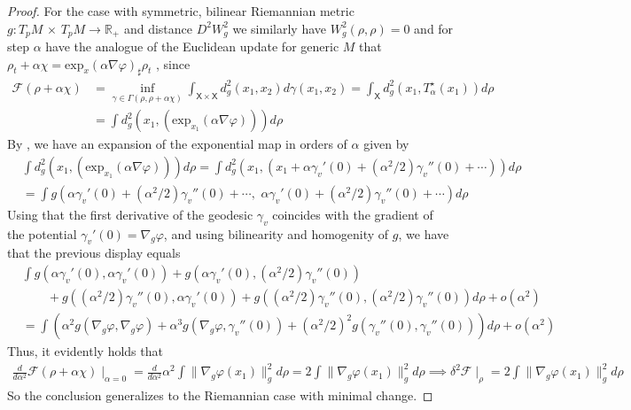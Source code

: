 \documentclass[reqno,11pt,letterpaper]{amsart}
\theoremstyle{plain}
\theoremstyle{definition}
\theoremstyle{remark}
\newcommand{\rgrad}{\nabla_{\!g}}
\begin{document}
\begin{proof}
For the case with symmetric, bilinear Riemannian metric $g: T_{p}M \, \times \, T_{p}M \to \mathbb{R}_{+}$ and distance $D^{2} W_{g}^{2}$ we similarly have $W_{g}^{2}(\rho, \rho ) = 0$ and for step $\alpha$ have the analogue of the Euclidean update for generic $M$ that $\rho_{t}+\alpha\chi =\mathrm{exp}_{x}(\alpha \nabla \varphi)_{\sharp} \rho_{t}$ \cite{McCann2001}, since
\begin{align*}
    \mathcal{F} (\rho + \alpha \chi) &= \inf_{\gamma \in \Gamma(\rho, \rho + \alpha \chi)} \int_{\mathsf{X} \times \mathsf{X}} d_{g}^{2}( x_{1} , x_{2} ) d\gamma(x_{1}, x_{2}) = \int_\mathsf{X} d_{g}^{2}(x_{1} , T^{\star}_{\alpha}(x_{1}) ) d \rho \\
    & = \int d_{g}^{2}( x_{1} ,\left( \mathrm{exp}_{x_{1}}(\alpha \nabla \varphi) \right) ) d \rho 
\end{align*}
By \cite{Monera2013}, we have an expansion of the exponential map in orders of $\alpha$ given by
\begin{align*}
  &\int d_{g}^{2}( x_{1} , \left( \mathrm{exp}_{x_{1}}(\alpha \nabla \varphi) \right) ) d \rho = \int d_{g}^{2}( x_{1} , \left( 
  x_{1}
  + \alpha \gamma_{v}'(0) + (\alpha^{2}/2) \gamma_{v}''(0) + \cdots
   \right) ) d \rho \\
   &= \int g\left( 
  \alpha \gamma_{v}'(0) + (\alpha^{2}/2) \gamma_{v}''(0) + \cdots, \,\, \alpha \gamma_{v}'(0) + (\alpha^{2}/2) \gamma_{v}''(0) + \cdots
   \right) d \rho
\end{align*}
Using that the first derivative of the geodesic $\gamma_{v}$ coincides with the gradient of the potential $\gamma_{v}'(0)=\nabla_{g}\varphi$, and using bilinearity and homogenity of $g$, we have that the previous display equals
\begin{align*}
   & \int g\left( 
  \alpha \gamma_{v}'(0), \alpha \gamma_{v}'(0)\right) + g\left(\alpha \gamma_{v}'(0), (\alpha^{2}/2) \gamma_{v}''(0) \right)  \\
  &\qquad +g\left((\alpha^{2}/2) \gamma_{v}''(0), \alpha \gamma_{v}'(0)\right)
  + g\left( (\alpha^{2}/2) \gamma_{v}''(0),  (\alpha^{2}/2) \gamma_{v}''(0)
  \right) d \rho + o(\alpha^{2}) \\
  &= \int \left( \alpha^{2} g\left( 
  \rgrad \varphi,  \rgrad \varphi\right) + \alpha^{3}g\left( \rgrad \varphi,  \gamma_{v}''(0) \right) 
  + (\alpha^{2}/2)^{2}g\left( \gamma_{v}''(0), \gamma_{v}''(0)
  \right) \right) d \rho + o(\alpha^{2}) 
\end{align*}
Thus, it evidently holds that
\begin{align*}
    \frac{d}{d\alpha^{2}} \mathcal{F}(\rho + \alpha \chi) \mid_{\alpha = 0} = \frac{d}{d\alpha^{2}}\alpha^{2} \int \lVert \rgrad \varphi(x_{1}) \rVert_{g}^{2} d \rho = 2\int \lVert \rgrad \varphi(x_{1}) \rVert_{g}^{2} d \rho \implies \delta^{2} \mathcal{F} \mid_{\rho} = 2\int \lVert \rgrad \varphi(x_{1}) \rVert_{g}^{2} d \rho
\end{align*}
So the conclusion generalizes to the Riemannian case with minimal change.
\end{proof}
\end{document}
